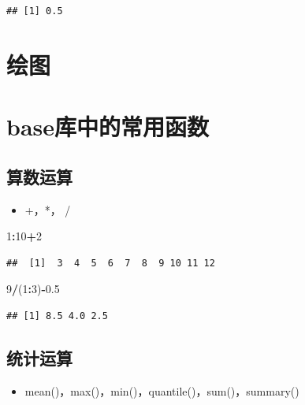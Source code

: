 \documentclass[]{book}
\newenvironment{Shaded}{\begin{snugshade}}{\end{snugshade}}
\newcommand{\DecValTok}[1]{\textcolor[rgb]{0.00,0.00,0.81}{#1}}
\newcommand{\FloatTok}[1]{\textcolor[rgb]{0.00,0.00,0.81}{#1}}
\newcommand{\NormalTok}[1]{#1}
\newcommand{\OperatorTok}[1]{\textcolor[rgb]{0.81,0.36,0.00}{\textbf{#1}}}
\providecommand{\tightlist}{%
  \setlength{\itemsep}{0pt}\setlength{\parskip}{0pt}}
\begin{document}
\begin{verbatim}
## [1] 0.5
\end{verbatim}

\hypertarget{section-8}{%
\section{绘图}\label{section-8}}

\hypertarget{base}{%
\section{base库中的常用函数}\label{base}}

\hypertarget{section-9}{%
\subsection{算数运算}\label{section-9}}

\begin{itemize}
\tightlist
\item
  +，*， /
\end{itemize}

\begin{Shaded}
\begin{Highlighting}[]
\DecValTok{1}\OperatorTok{:}\DecValTok{10}\OperatorTok{+}\DecValTok{2}
\end{Highlighting}
\end{Shaded}

\begin{verbatim}
##  [1]  3  4  5  6  7  8  9 10 11 12
\end{verbatim}

\begin{Shaded}
\begin{Highlighting}[]
\DecValTok{9}\OperatorTok{/}\NormalTok{(}\DecValTok{1}\OperatorTok{:}\DecValTok{3}\NormalTok{)}\OperatorTok{-}\FloatTok{0.5}
\end{Highlighting}
\end{Shaded}

\begin{verbatim}
## [1] 8.5 4.0 2.5
\end{verbatim}

\hypertarget{section-10}{%
\subsection{统计运算}\label{section-10}}

\begin{itemize}
\tightlist
\item
  mean()，max()，min()，quantile()，sum()，summary()
\end{itemize}
\end{document}
